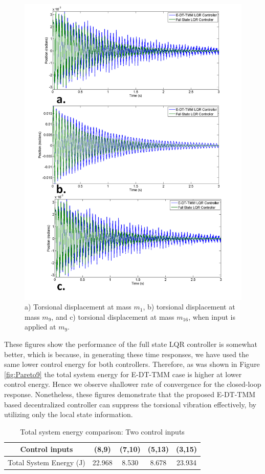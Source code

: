 \documentclass[11pt]{ucthesis}
\begin{document}
\begin{figure}[thpb]
\centering
\includegraphics[width=.65\linewidth]{Figures/Position.png}
\caption{a) Torsional displacement at mass $m_1$, b) torsional displacement at mass $m_9$, and c) torsional displacement at mass $m_{16}$, when input is applied at $m_9$.}
\label{time_m_1}
\end{figure}

These figures show the performance of the full state LQR controller is somewhat better, which is because, in generating these time responses, we have used the same lower control energy for both controllers. Therefore, as was shown in Figure \ref{fig:Pareto9} the total system energy for E-DT-TMM case is higher at lower control energy. Hence we observe shallower rate of convergence for the closed-loop response. Nonetheless, these figures demonstrate that the proposed E-DT-TMM based decentralized controller can suppress the torsional vibration effectively, by utilizing only the local state information.

\begin{table}
\begin{center}
\caption{Total system energy comparison: Two control inputs}
\label{t:twoinputs}
\begin{tabular}{|c||c|c|c|c|}
\hline
Control inputs & (8,9) & (7,10) & (5,13) & (3,15) \\
\hline
Total System Energy (J) & 22.968 & 8.530 & 8.678 & 23.934 \\ 
\hline
\end{tabular}
\end{center}
\end{table}
\end{document}
